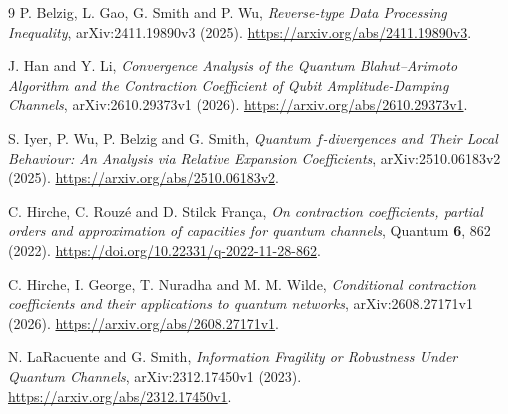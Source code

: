 \documentclass[11pt,a4paper]{article}
\theoremstyle{remark}\newtheorem{remark}[theorem]{Remark}
\begin{document}
\begin{thebibliography}{9}
P. Belzig, L. Gao, G. Smith and P. Wu,
\emph{Reverse-type Data Processing Inequality},
arXiv:2411.19890v3 (2025).
\url{https://arxiv.org/abs/2411.19890v3}.

J. Han and Y. Li,
\emph{Convergence Analysis of the Quantum Blahut--Arimoto Algorithm and the
Contraction Coefficient of Qubit Amplitude-Damping Channels},
arXiv:2610.29373v1 (2026).
\url{https://arxiv.org/abs/2610.29373v1}.

S. Iyer, P. Wu, P. Belzig and G. Smith,
\emph{Quantum $f$-divergences and Their Local Behaviour:
An Analysis via Relative Expansion Coefficients},
arXiv:2510.06183v2 (2025).
\url{https://arxiv.org/abs/2510.06183v2}.

C. Hirche, C. Rouz\'e and D. Stilck Fran\c{c}a,
\emph{On contraction coefficients, partial orders and approximation of
capacities for quantum channels}, Quantum \textbf{6}, 862 (2022).
\url{https://doi.org/10.22331/q-2022-11-28-862}.

C. Hirche, I. George, T. Nuradha and M. M. Wilde,
\emph{Conditional contraction coefficients and their applications to quantum networks},
arXiv:2608.27171v1 (2026).
\url{https://arxiv.org/abs/2608.27171v1}.

N. LaRacuente and G. Smith,
\emph{Information Fragility or Robustness Under Quantum Channels},
arXiv:2312.17450v1 (2023).
\url{https://arxiv.org/abs/2312.17450v1}.
\end{thebibliography}
\end{document}

